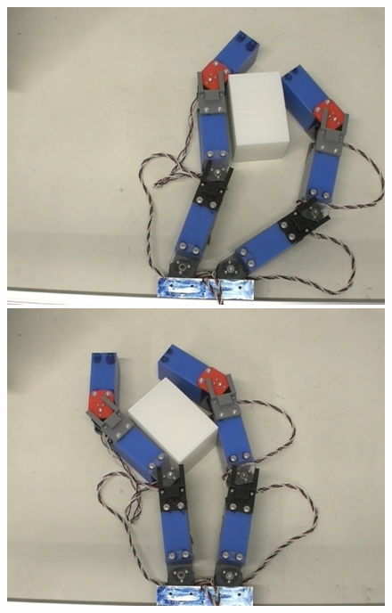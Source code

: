 \documentclass[a4paper,twoside,12pt,papersize, dvipdfmx]{iirthesis}
\begin{document}
\begin{figure}[b]
\begin{minipage}{0.24\hsize}
\centering
\includegraphics[width=\hsize]{fig/1-introduction/komiyama/mani5.png}
\subcaption{}
\end{minipage}\hfill
\begin{minipage}{0.24\hsize}
\centering
\includegraphics[width=\hsize]{fig/1-introduction/komiyama/mani6.png}
\subcaption{}
\end{minipage}\hfill
\begin{minipage}{0.24\hsize}
\centering

\end{minipage}
\end{figure}
\end{document}
